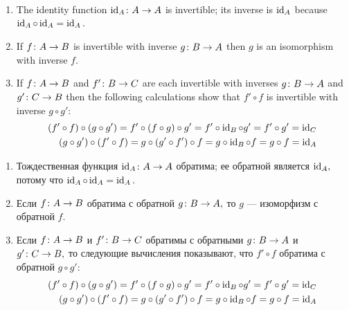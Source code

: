 \documentclass[../main/CT4S-EN-RU]{subfiles}
\begin{document}
\begin{proofENG}
\begin{enumerate}
\item The identity function $\operatorname{id}_A\colon A\rightarrow A$ is invertible; its inverse is $\operatorname{id}_A$ because $\operatorname{id}_A\circ\operatorname{id}_A=\operatorname{id}_A.$
\item If $f\colon A\rightarrow B$ is invertible with inverse $g\colon B\rightarrow A$ then $g$ is an isomorphism with inverse $f.$
\item If $f\colon A\rightarrow B$ and $f'\colon B\rightarrow C$ are each invertible with inverses $g\colon B\rightarrow A$ and $g'\colon C\rightarrow B$ then the following calculations show that $f'\circ f$ is invertible with inverse $g\circ g'$: 
\begin{align*}
(f'\circ f)\circ(g\circ g')=f'\circ(f\circ g)\circ g'=f'\circ\operatorname{id}_B\circ g'=f'\circ g'=\operatorname{id}_C\\
(g\circ g')\circ(f'\circ f)=g\circ(g'\circ f')\circ f=g\circ\operatorname{id}_B\circ f=g\circ f=\operatorname{id}_A
\end{align*}
\end{enumerate}
\end{proofENG}

\begin{proofRUS}
\begin{enumerate}
\item Тождественная функция $\operatorname{id}_A\colon A\rightarrow A$ обратима; ее обратной является $\operatorname{id}_A,$ потому что $\operatorname{id}_A\circ\operatorname{id}_A=\operatorname{id}_A.$
\item Если $f\colon A\rightarrow B$ обратима с обратной $g\colon B\rightarrow A,$ то $g$ — изоморфизм с обратной $f.$
\item Если $f\colon A\rightarrow B$ и $f'\colon B\rightarrow C$ обратимы с обратными $g\colon B\rightarrow A$ и $g'\colon C\rightarrow B,$ то следующие вычисления показывают, что $f'\circ f$ обратима с обратной $g\circ g'$: 
\begin{align*}
(f'\circ f)\circ(g\circ g')=f'\circ(f\circ g)\circ g'=f'\circ\operatorname{id}_B\circ g'=f'\circ g'=\operatorname{id}_C\\
(g\circ g')\circ(f'\circ f)=g\circ(g'\circ f')\circ f=g\circ\operatorname{id}_B\circ f=g\circ f=\operatorname{id}_A
\end{align*}
\end{enumerate}
\end{proofRUS}
\end{document}
